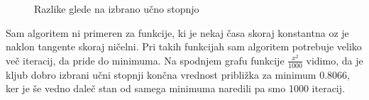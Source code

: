 \documentclass{article}
\begin{document}
\begin{figure}[h]
    \centering
    \caption{Razlike glede na izbrano učno stopnjo}
    \label{fig:foobar}
\end{figure}


\noindent Sam algoritem ni primeren za funkcije, ki je nekaj časa skoraj konstantna oz je naklon tangente skoraj ničelni. Pri takih funkcijah sam algoritem potrebuje veliko več iteracij, da pride do minimuma. Na spodnjem grafu funkcije $\frac{x^2}{1000}$ vidimo, da je kljub dobro izbrani učni stopnji končna vrednost približka za minimum 0.8066, ker je še vedno daleč stan od samega minimuma naredili pa smo 1000 iteracij.
\end{document}
